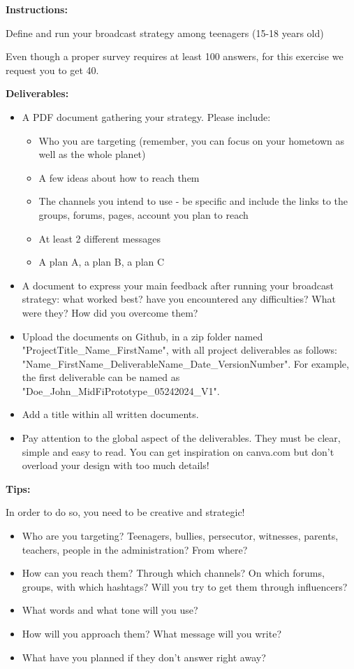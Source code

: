 \makeheaderfiles

\textbf{Instructions:}

Define and run your broadcast strategy among teenagers (15-18 years old)

Even though a proper survey requires at least 100 answers, for this exercise we request you to get 40.

\textbf{Deliverables:}

\begin{itemize}
\item A PDF document gathering your strategy. Please include:
\begin{itemize}
\item Who you are targeting (remember, you can focus on your hometown as well as the whole planet)
\item A few ideas about how to reach them
\item The channels you intend to use - be specific and include the links to the groups, forums, pages, account you plan to reach
\item At least 2 different messages
\item A plan A, a plan B, a plan C
\end{itemize}
\item A document to express your main feedback after running your broadcast strategy: what worked best? have you encountered any difficulties? What were they? How did you overcome them?
\item Upload the documents on Github, in a zip folder named "ProjectTitle\_Name\_FirstName", with all project deliverables as follows: "Name\_FirstName\_DeliverableName\_Date\_VersionNumber".  For example, the first deliverable can be named as "Doe\_John\_MidFiPrototype\_05242024\_V1".
\item Add a title within all written documents.
\item Pay attention to the global aspect of the deliverables. They must be clear, simple and easy to read. You can get inspiration on canva.com but don't overload your design with too much details!
\end{itemize}

\textbf{Tips:}

In order to do so, you need to be creative and strategic!

\begin{itemize}
\item Who are you targeting? Teenagers, bullies, persecutor, witnesses, parents, teachers, people in the administration? From where?
\item How can you reach them? Through which channels? On which forums, groups, with which hashtags? Will you try to get them through influencers?
\item What words and what tone will you use?
\item How will you approach them? What message will you write?
\item What have you planned if they don't answer right away?
\end{itemize}

